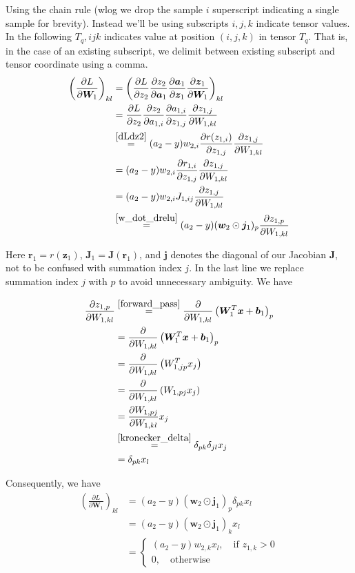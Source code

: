 \documentclass[varwidth,border=2cm]{standalone}
\newcommand{\pd}[2]{\frac{\partial #1}{\partial #2}}
\newcommand{\req}[1]{\overset{\eqref{#1}}{=}}
\begin{document}
Using the chain rule (wlog we drop the sample $i$ superscript indicating a single sample for brevity). Instead we'll be using subscripts $i,j,k$ indicate tensor values. In the following $T_q,ijk$ indicates value at position $(i,j,k)$ in tensor $T_q$. That is, in the case of an existing subscript, we delimit between existing subscript and tensor coordinate using a comma.
\begin{align}\label{derivation_dLdW1}
\left(\frac{\partial L}{\partial \bm W_1}\right)_{kl} &= \left( \frac{\partial L}{\partial z_2}\frac{\partial z_2}{\partial \bm a_1}\frac{\partial \bm a_1}{\partial \bm z_1}\frac{\partial \bm z_1}{\partial \bm W_1} \right)_{kl} \\
 &= \frac{\partial L}{\partial z_2}\frac{\partial z_2}{\partial a_{1,i}} \pd{a_{1,i}}{z_{1,j}} \pd{z_{1,j}}{W_{1,kl}} \nonumber \\
 & \req{dLdz2} (a_2 - y) w_{2, i} \pd{r(z_{1,i})}{z_{1,j}} \pd{z_{1,j}}{W_{1,kl}} \nonumber \\
 &= (a_2 - y) w_{2, i} \pd{r_{1,i}}{z_{1,j}} \pd{z_{1,j}}{W_{1,kl}} \nonumber \\
 &= (a_2 - y) w_{2, i} J_{1,ij} \pd{z_{1,j}}{W_{1,kl}} \nonumber \\
 & \req{w_dot_drelu} (a_2 - y) (\bm w_2 \odot \bm j_1)_p \pd{z_{1,p}}{W_{1,kl}} \nonumber
\end{align}

Here $\bm r_1 = r(\bm z_1)$, $\bm J_1 = \bm J(\bm r_1)$, and $\bm j$ denotes the diagonal of our Jacobian $\bm J$, not to be confused with summation index $j$. In the last line we replace summation index $j$ with $p$ to avoid unnecessary ambiguity. We have

\begin{align}
\pd{z_{1,p}}{W_{1,kl}} &\req{forward_pass} \pd{}{W_{1,kl}} \left( \bm W^T_1 \bm x + \bm b_1\right)_p \\
&= \pd{}{W_{1,kl}} \left( \bm W^T_1 \bm x + \bm b_1\right)_p \nonumber \\
&= \pd{}{W_{1,kl}} \left( W^T_{1,jp} x_j \right) \nonumber \\
&= \pd{}{W_{1,kl}} \left( W_{1,pj} x_j \right) \nonumber \\
&= \pd{W_{1,pj}}{W_{1,kl}} x_j \nonumber \\
& \req{kronecker_delta} \delta_{pk} \delta_{jl} x_j \nonumber \\
&= \delta_{pk} x_l \nonumber
\end{align}

Consequently, we have
\begin{align}
\left(\pd{L}{\bm W_1}\right)_{kl} &= (a_2 - y) (\bm w_2 \odot \bm j_1) _p \delta _{pk}x_l \\
&= (a_2 - y) (\bm w_2 \odot \bm j_1) _k x_l \nonumber \\
&= 
\begin{cases}
(a_2 - y) w_{2,k} x_l, \quad \text{if } z_{1,k} > 0 \\
0,\quad\text{otherwise}
\end{cases} \nonumber
\end{align}
\end{document}
